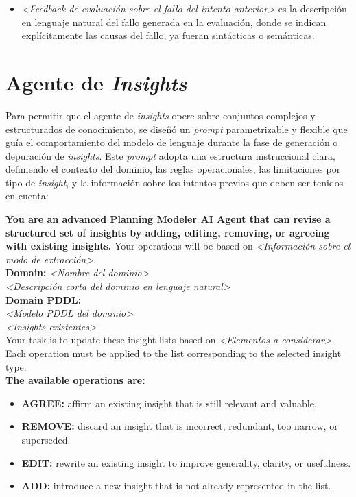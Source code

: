 \begin{anexes}
\begin{itemize}
    \item \textit{<Feedback de evaluación sobre el fallo del intento anterior>} es la descripción en lenguaje natural del fallo generada en la evaluación, donde se indican explícitamente las causas del fallo, ya fueran sintácticas o semánticas.
\end{itemize}

\section*{Agente de \textit{Insights}}

Para permitir que el agente de \textit{insights} opere sobre conjuntos complejos y estructurados de conocimiento, se diseñó un \textit{prompt} parametrizable y flexible que guía el comportamiento del modelo de lenguaje durante la fase de generación o depuración de \textit{insights}. Este \textit{prompt} adopta una estructura instruccional clara, definiendo el contexto del dominio, las reglas operacionales, las limitaciones por tipo de \textit{insight}, y la información sobre los intentos previos que deben ser tenidos en cuenta:

\begin{tcolorbox}[colback=gray!10!white, colframe=black, title=\textit{Prompt} del agente de \textit{insights}, fonttitle=\bfseries, breakable]
\textbf{You are an advanced Planning Modeler AI Agent that can revise a structured set of insights by adding, editing, removing, or agreeing with existing insights.} Your operations will be based on \textit{<Información sobre el modo de extracción>}.\\

\textbf{Domain:} \textit{<Nombre del dominio>} \\
\textit{<Descripción corta del dominio en lenguaje natural>}\\

\textbf{Domain PDDL:} \\
\textit{<Modelo PDDL del dominio>}\\

\textit{<Insights existentes>} \\

Your task is to update these insight lists based on \textit{<Elementos a considerar>}. Each operation must be applied to the list corresponding to the selected insight type.\\

\textbf{The available operations are:} \\
\begin{itemize}
    \item \textbf{AGREE:} affirm an existing insight that is still relevant and valuable.
    \item \textbf{REMOVE:} discard an insight that is incorrect, redundant, too narrow, or superseded.
    \item \textbf{EDIT:} rewrite an existing insight to improve generality, clarity, or usefulness.
    \item \textbf{ADD:} introduce a new insight that is not already represented in the list.
\end{itemize}


\end{tcolorbox}
\end{anexes}
